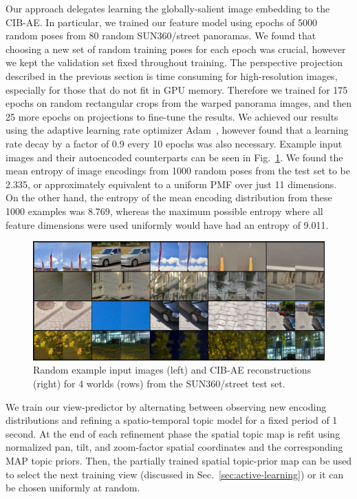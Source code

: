 Our approach delegates learning the globally-salient image embedding to the CIB-AE. In particular, we trained our feature model using epochs of 5000 random poses from 80 random SUN360/street panoramas. We found that choosing a new set of random training poses for each epoch was crucial, however we kept the validation set fixed throughout training. The perspective projection described in the previous section is time consuming for high-resolution images, especially for those that do not fit in GPU memory. Therefore we trained for 175 epochs on random rectangular crops from the warped panorama images, and then 25 more epochs on projections to fine-tune the results. We achieved our results using the adaptive learning rate optimizer Adam~\citep{KingmaAdam}, however found that a learning rate decay by a factor of 0.9 every 10 epochs was also necessary. Example input images and their autoencoded counterparts can be seen in Fig.~\ref{fig:cibae_encodings}. We found the mean entropy of image encodings from 1000 random poses from the test set to be 2.335, or approximately equivalent to a uniform PMF over just 11 dimensions. On the other hand, the entropy of the mean encoding distribution from these 1000 examples was 8.769, whereas the maximum possible entropy where all feature dimensions were used uniformly would have had an entropy of 9.011.

\begin{figure}
    \centering
    \includegraphics[width=\textwidth]{figures/ptz/mc3ae_encodings}
    \caption{Random example input images (left) and CIB-AE reconstructions (right) for 4 worlds (rows) from the SUN360/street test set.}
    \label{fig:cibae_encodings}
\end{figure}

We train our view-predictor by alternating between observing new encoding distributions and refining a spatio-temporal topic model for a fixed period of 1 second. At the end of each refinement phase the spatial topic map is refit using normalized pan, tilt, and zoom-factor spatial coordinates and the corresponding MAP topic priors. Then, the partially trained spatial topic-prior map can be used to select the next training view (discussed in Sec.~\ref{sec:active-learning}) or it can be chosen uniformly at random.

